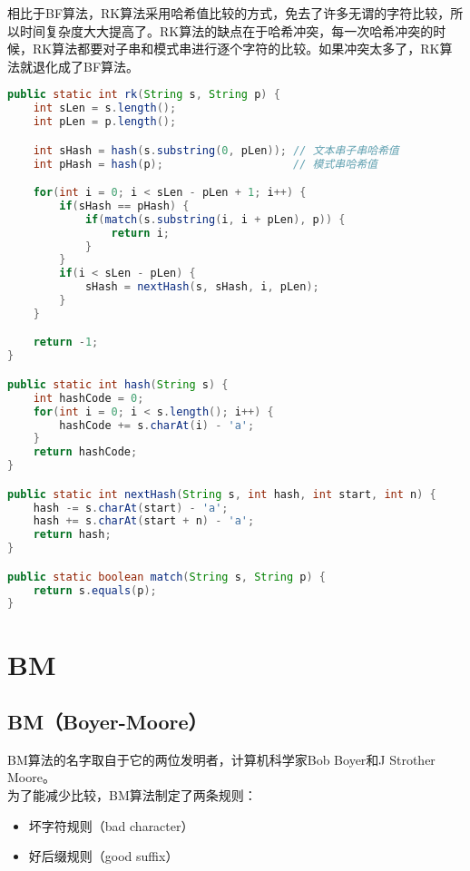 相比于BF算法，RK算法采用哈希值比较的方式，免去了许多无谓的字符比较，所以时间复杂度大大提高了。RK算法的缺点在于哈希冲突，每一次哈希冲突的时候，RK算法都要对子串和模式串进行逐个字符的比较。如果冲突太多了，RK算法就退化成了BF算法。 \\


\begin{lstlisting}[language=Java]
public static int rk(String s, String p) {
    int sLen = s.length();
    int pLen = p.length();

    int sHash = hash(s.substring(0, pLen)); // 文本串子串哈希值
    int pHash = hash(p);                    // 模式串哈希值

    for(int i = 0; i < sLen - pLen + 1; i++) {
        if(sHash == pHash) {
            if(match(s.substring(i, i + pLen), p)) {
                return i;
            }
        }
        if(i < sLen - pLen) {
            sHash = nextHash(s, sHash, i, pLen);
        }
    }

    return -1;
}

public static int hash(String s) {
    int hashCode = 0;
    for(int i = 0; i < s.length(); i++) {
        hashCode += s.charAt(i) - 'a';
    }
    return hashCode;
}

public static int nextHash(String s, int hash, int start, int n) {
    hash -= s.charAt(start) - 'a';
    hash += s.charAt(start + n) - 'a';
    return hash;
}

public static boolean match(String s, String p) {
    return s.equals(p);
}
\end{lstlisting}

\newpage

\section{BM}

\subsection{BM（Boyer-Moore）}

BM算法的名字取自于它的两位发明者，计算机科学家Bob Boyer和J Strother Moore。 \\

为了能减少比较，BM算法制定了两条规则：

\begin{itemize}
	\item 坏字符规则（bad character）
	\item 好后缀规则（good suffix）
\end{itemize}

